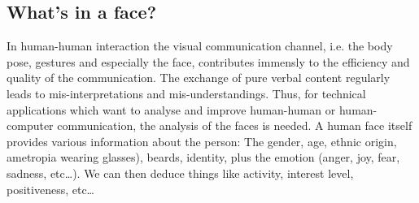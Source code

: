 \subsection{What's in a face?}
 In human-human interaction the visual communication channel, i.e. the body pose, gestures and especially the face, contributes immensly to the efficiency and quality of the communication. The exchange of pure verbal content  regularly leads to mis-interpretations and mis-understandings. Thus, for technical applications which want to analyse and improve human-human or human-computer communication, the analysis of the faces is needed. A human face itself provides various information about the person: The gender, age, ethnic origin, ametropia wearing glasses), beards, identity, plus the emotion (anger, joy, fear, sadness, etc\dots ). We can then deduce things like activity, interest level, positiveness, etc\dots
